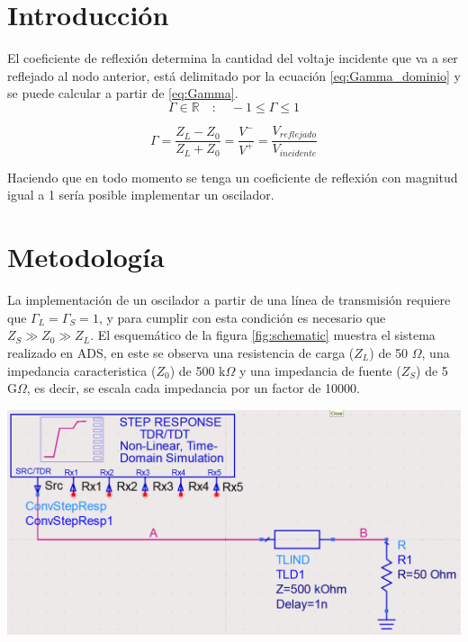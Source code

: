 \documentclass{article}   %
\theoremstyle{mytheoremstyle}
\theoremstyle{mytheoremstyle}
\theoremstyle{myproblemstyle}
\begin{document}
    \noindent\begin{minipage}{0.49\textwidth}   %
        {\centering\section*{\large Introducción}}

        El coeficiente de reflexión determina la cantidad del voltaje incidente que va a ser reflejado al nodo anterior, está delimitado
        por la ecuación \eqref{eq:Gamma_dominio} y se puede calcular a partir de \eqref{eq:Gamma}.
        \begin{equation}
            \Gamma \in \mathbb{R} \quad : \quad -1 \leq \Gamma \leq 1
            \label{eq:Gamma_dominio}
        \end{equation}

        \begin{equation}
            \Gamma = \frac{Z_{L} - Z_{0}}{Z_{L} + Z_{0}} = \frac{V^{-}}{V^{+}} = \frac{V_{reflejado}}{V_{incidente}}
            \label{eq:Gamma}
        \end{equation}
        
        Haciendo que en todo momento se tenga un coeficiente de reflexión con magnitud igual a 1 sería posible implementar un 
        oscilador.

        \vspace{1 mm}
        {\centering\section*{\large Metodología}}
        La implementación de un oscilador a partir de una línea de transmisión requiere que $\Gamma_{L} = \Gamma_{S} = 1$, y para 
        cumplir con esta condición es necesario que $Z_{S} \gg Z_{0} \gg Z_{L}$. El esquemático de la figura \ref{fig:schematic} muestra el sistema
        realizado en ADS, en este se observa una resistencia de carga ($Z_{L}$) de 50 $\Omega$, una impedancia caracteristica ($Z_{0}$) 
        de 500 k$\Omega$ y una impedancia de fuente ($Z_{S}$) de 5 G$\Omega$, es decir, se escala cada impedancia por un factor de 10000.

        \vspace{0.4 cm}
        \includegraphics[width=\linewidth]{figures/schematic.png}
        \label{fig:schematic}
        \vspace{0.4 cm}


\end{minipage}
\end{document}

